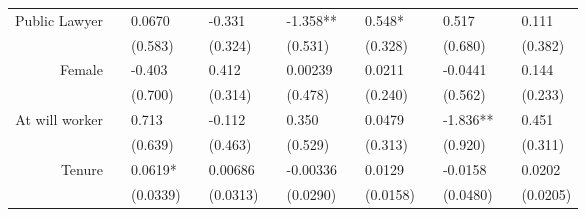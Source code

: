 \begin{tabular}{rrrrrrrrrrrrr}
Public Lawyer & \multicolumn{1}{l}{} & \multicolumn{1}{l}{0.0670} & \multicolumn{1}{l}{} & \multicolumn{1}{l}{-0.331} & \multicolumn{1}{l}{} & \multicolumn{1}{l}{-1.358**} & \multicolumn{1}{l}{} & \multicolumn{1}{l}{0.548*} & \multicolumn{1}{l}{} & \multicolumn{1}{l}{0.517} & \multicolumn{1}{l}{} & \multicolumn{1}{l}{0.111} \\
      & \multicolumn{1}{l}{} & \multicolumn{1}{l}{(0.583)} & \multicolumn{1}{l}{} & \multicolumn{1}{l}{(0.324)} & \multicolumn{1}{l}{} & \multicolumn{1}{l}{(0.531)} & \multicolumn{1}{l}{} & \multicolumn{1}{l}{(0.328)} & \multicolumn{1}{l}{} & \multicolumn{1}{l}{(0.680)} & \multicolumn{1}{l}{} & \multicolumn{1}{l}{(0.382)} \\
Female & \multicolumn{1}{l}{} & \multicolumn{1}{l}{-0.403} & \multicolumn{1}{l}{} & \multicolumn{1}{l}{0.412} & \multicolumn{1}{l}{} & \multicolumn{1}{l}{0.00239} & \multicolumn{1}{l}{} & \multicolumn{1}{l}{0.0211} & \multicolumn{1}{l}{} & \multicolumn{1}{l}{-0.0441} & \multicolumn{1}{l}{} & \multicolumn{1}{l}{0.144} \\
      & \multicolumn{1}{l}{} & \multicolumn{1}{l}{(0.700)} & \multicolumn{1}{l}{} & \multicolumn{1}{l}{(0.314)} & \multicolumn{1}{l}{} & \multicolumn{1}{l}{(0.478)} & \multicolumn{1}{l}{} & \multicolumn{1}{l}{(0.240)} & \multicolumn{1}{l}{} & \multicolumn{1}{l}{(0.562)} & \multicolumn{1}{l}{} & \multicolumn{1}{l}{(0.233)} \\
At will worker & \multicolumn{1}{l}{} & \multicolumn{1}{l}{0.713} & \multicolumn{1}{l}{} & \multicolumn{1}{l}{-0.112} & \multicolumn{1}{l}{} & \multicolumn{1}{l}{0.350} & \multicolumn{1}{l}{} & \multicolumn{1}{l}{0.0479} & \multicolumn{1}{l}{} & \multicolumn{1}{l}{-1.836**} & \multicolumn{1}{l}{} & \multicolumn{1}{l}{0.451} \\
      & \multicolumn{1}{l}{} & \multicolumn{1}{l}{(0.639)} & \multicolumn{1}{l}{} & \multicolumn{1}{l}{(0.463)} & \multicolumn{1}{l}{} & \multicolumn{1}{l}{(0.529)} & \multicolumn{1}{l}{} & \multicolumn{1}{l}{(0.313)} & \multicolumn{1}{l}{} & \multicolumn{1}{l}{(0.920)} & \multicolumn{1}{l}{} & \multicolumn{1}{l}{(0.311)} \\
Tenure & \multicolumn{1}{l}{} & \multicolumn{1}{l}{0.0619*} & \multicolumn{1}{l}{} & \multicolumn{1}{l}{0.00686} & \multicolumn{1}{l}{} & \multicolumn{1}{l}{-0.00336} & \multicolumn{1}{l}{} & \multicolumn{1}{l}{0.0129} & \multicolumn{1}{l}{} & \multicolumn{1}{l}{-0.0158} & \multicolumn{1}{l}{} & \multicolumn{1}{l}{0.0202} \\
      & \multicolumn{1}{l}{} & \multicolumn{1}{l}{(0.0339)} & \multicolumn{1}{l}{} & \multicolumn{1}{l}{(0.0313)} & \multicolumn{1}{l}{} & \multicolumn{1}{l}{(0.0290)} & \multicolumn{1}{l}{} & \multicolumn{1}{l}{(0.0158)} & \multicolumn{1}{l}{} & \multicolumn{1}{l}{(0.0480)} & \multicolumn{1}{l}{} & \multicolumn{1}{l}{(0.0205)} \\

\end{tabular}

